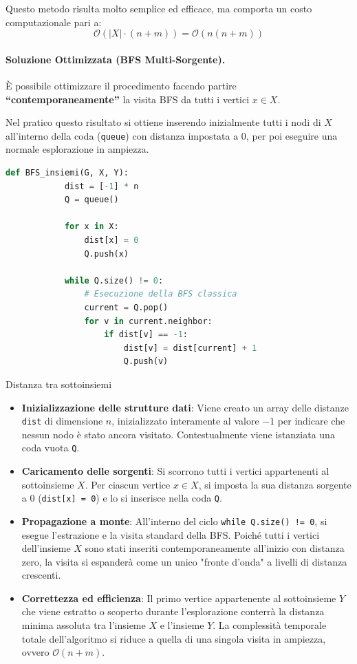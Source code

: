 \documentclass[12pt]{report}
\begin{document}
	Questo metodo risulta molto semplice ed efficace, ma comporta un costo computazionale pari a:
	\[
		\mathcal{O}(|X| \cdot (n + m)) = \mathcal{O}(n(n + m))
	\]
	
	\paragraph{Soluzione Ottimizzata (BFS Multi-Sorgente).}
	È possibile ottimizzare il procedimento facendo partire \textbf{``contemporaneamente''} la visita BFS da tutti i vertici $x \in X$. 
	
	Nel pratico questo risultato si ottiene inserendo inizialmente tutti i nodi di $X$ all'interno della coda (\texttt{queue}) con distanza impostata a $0$, per poi eseguire una normale esplorazione in ampiezza.
	
	\newpage
	\begin{lstlisting}[style=stile-listings, language=Python, caption={Algoritmo BFS multi-sorgente per la distanza tra sottoinsiemi}]
		def BFS_insiemi(G, X, Y):
			dist = [-1] * n
			Q = queue()
			
			for x in X:
				dist[x] = 0
				Q.push(x)
			
			while Q.size() != 0:
				# Esecuzione della BFS classica
				current = Q.pop()
				for v in current.neighbor:
					if dist[v] == -1:
						dist[v] = dist[current] + 1
						Q.push(v)
	\end{lstlisting}
	
	\begin{algoritmo}{Distanza tra sottoinsiemi}{}
		\begin{itemize}
			\item \textbf{Inizializzazione delle strutture dati}: Viene creato un array delle distanze \texttt{dist} di dimensione $n$, inizializzato interamente al valore $-1$ per indicare che nessun nodo è stato ancora visitato. Contestualmente viene istanziata una coda vuota \texttt{Q}.
			
			\item \textbf{Caricamento delle sorgenti}: Si scorrono tutti i vertici appartenenti al sottoinsieme $X$. Per ciascun vertice $x \in X$, si imposta la sua distanza sorgente a $0$ (\texttt{dist[x] = 0}) e lo si inserisce nella coda \texttt{Q}.
			
			\item \textbf{Propagazione a monte}: All'interno del ciclo \texttt{while Q.size() != 0}, si esegue l'estrazione e la visita standard della BFS. Poiché tutti i vertici dell'insieme $X$ sono stati inseriti contemporaneamente all'inizio con distanza zero, la visita si espanderà come un unico "fronte d'onda" a livelli di distanza crescenti.
			
			\item \textbf{Correttezza ed efficienza}: Il primo vertice appartenente al sottoinsieme $Y$ che viene estratto o scoperto durante l'esplorazione conterrà la distanza minima assoluta tra l'insieme $X$ e l'insieme $Y$. La complessità temporale totale dell'algoritmo si riduce a quella di una singola visita in ampiezza, ovvero $\mathcal{O}(n + m)$.
		\end{itemize}
	\end{algoritmo}
	
\end{document}
